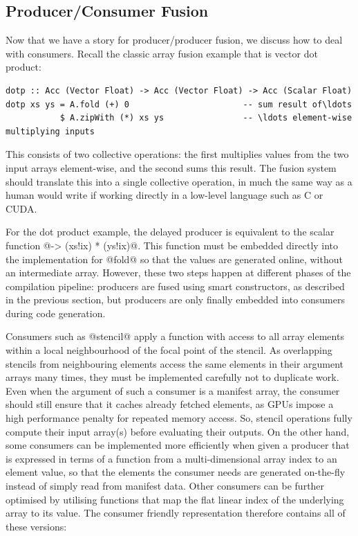 \subsection{Producer/Consumer Fusion}
\label{sec:producer_consumer_fusion}

Now that we have a story for producer/producer fusion, we discuss how to deal
with consumers. Recall the classic array fusion example that is vector dot
product:

\begin{lstlisting}[style=haskell]
dotp :: Acc (Vector Float) -> Acc (Vector Float) -> Acc (Scalar Float)
dotp xs ys = A.fold (+) 0                       -- sum result of\ldots
           $ A.zipWith (*) xs ys                -- \ldots element-wise multiplying inputs
\end{lstlisting}
%
This consists of two collective operations: the first multiplies values from the
two input arrays element-wise, and the second sums this result. The fusion
system should translate this into a single collective operation, in much the
same way as a human would write if working directly in a low-level language such
as C or CUDA\@.

For the dot product example, the delayed producer is equivalent to the scalar
function @\ix -> (xs!ix) * (ys!ix)@. This function must be embedded directly
into the implementation for @fold@ so that the values are generated online,
without an intermediate array. However, these two steps happen at different
phases of the compilation pipeline: producers are fused using smart
constructors, as described in the previous section, but producers are only
finally embedded into consumers during code generation.


Consumers such as @stencil@ apply a function with access to all array
elements within a local neighbourhood of the focal point of the stencil. As
overlapping stencils from neighbouring elements access the same elements in
their argument arrays many times, they must be implemented carefully not to
duplicate work. Even when the argument of such a consumer is a manifest array,
the consumer should still ensure that it caches already fetched elements, as
GPUs impose a high performance penalty for repeated memory access. So, stencil
operations fully compute their input array(s) before evaluating their outputs.
On the other hand, some consumers can be implemented more efficiently when given
a producer that is expressed in terms of a function from a multi-dimensional
array index to an element value, so that the elements the consumer needs are
generated on-the-fly instead of simply read from manifest data. Other consumers
can be further optimised by utilising functions that map the flat linear index
of the underlying array to its value. The consumer friendly representation
therefore contains all of these versions:


